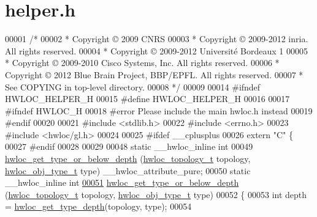 \hypertarget{a00031_source}{
\section{helper.h}
}

\begin{DoxyCode}
00001 \textcolor{comment}{/*}
00002 \textcolor{comment}{ * Copyright © 2009 CNRS}
00003 \textcolor{comment}{ * Copyright © 2009-2012 inria.  All rights reserved.}
00004 \textcolor{comment}{ * Copyright © 2009-2012 Université Bordeaux 1}
00005 \textcolor{comment}{ * Copyright © 2009-2010 Cisco Systems, Inc.  All rights reserved.}
00006 \textcolor{comment}{ * Copyright © 2012 Blue Brain Project, BBP/EPFL. All rights reserved.}
00007 \textcolor{comment}{ * See COPYING in top-level directory.}
00008 \textcolor{comment}{ */}
00009 
00014 \textcolor{preprocessor}{#ifndef HWLOC\_HELPER\_H}
00015 \textcolor{preprocessor}{}\textcolor{preprocessor}{#define HWLOC\_HELPER\_H}
00016 \textcolor{preprocessor}{}
00017 \textcolor{preprocessor}{#ifndef HWLOC\_H}
00018 \textcolor{preprocessor}{}\textcolor{preprocessor}{#error Please include the main hwloc.h instead}
00019 \textcolor{preprocessor}{}\textcolor{preprocessor}{#endif}
00020 \textcolor{preprocessor}{}
00021 \textcolor{preprocessor}{#include <stdlib.h>}
00022 \textcolor{preprocessor}{#include <errno.h>}
00023 \textcolor{preprocessor}{#include <hwloc/gl.h>}
00024 
00025 \textcolor{preprocessor}{#ifdef \_\_cplusplus}
00026 \textcolor{preprocessor}{}\textcolor{keyword}{extern} \textcolor{stringliteral}{"C"} \{
00027 \textcolor{preprocessor}{#endif}
00028 \textcolor{preprocessor}{}
00029 
00048 \textcolor{keyword}{static} \_\_hwloc\_inline \textcolor{keywordtype}{int}
00049 \hyperlink{a00052_ga081be77905201e9f42318e9974456b45}{hwloc_get_type_or_below_depth} (\hyperlink{a00039_ga9d1e76ee15a7dee158b786c30b6a6e38}{hwloc_topology_t} topology, \hyperlink{a00041_gacd37bb612667dc437d66bfb175a8dc55}{hwloc_obj_type_t} type) 
      \_\_hwloc\_attribute\_pure;
00050 \textcolor{keyword}{static} \_\_hwloc\_inline \textcolor{keywordtype}{int}
\hypertarget{a00031_source_l00051}{}\hyperlink{a00052_ga081be77905201e9f42318e9974456b45}{00051} \hyperlink{a00052_ga081be77905201e9f42318e9974456b45}{hwloc_get_type_or_below_depth} (\hyperlink{a00039_ga9d1e76ee15a7dee158b786c30b6a6e38}{hwloc_topology_t} topology, \hyperlink{a00041_gacd37bb612667dc437d66bfb175a8dc55}{hwloc_obj_type_t} type)
00052 \{
00053   \textcolor{keywordtype}{int} depth = \hyperlink{a00046_gaea7c64dd59467f5201ba87712710b14d}{hwloc_get_type_depth}(topology, type);
00054 

\end{DoxyCode}
